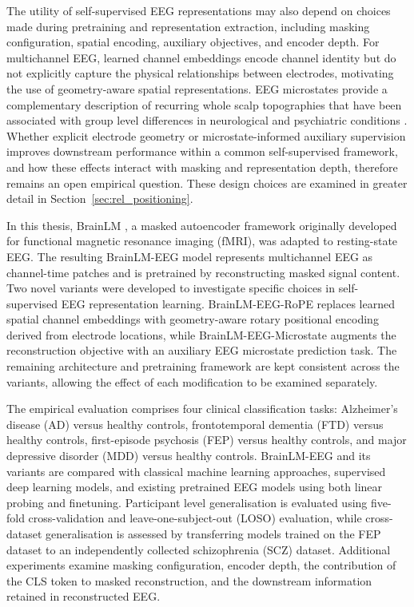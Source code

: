 The utility of self-supervised EEG representations may also depend on choices made during pretraining and representation extraction, including masking configuration, spatial encoding, auxiliary objectives, and encoder depth. For multichannel EEG, learned channel embeddings encode channel identity but do not explicitly capture the physical relationships between electrodes, motivating the use of geometry-aware spatial representations. EEG microstates provide a complementary description of recurring whole scalp topographies that have been associated with group level differences in neurological and psychiatric conditions \parencite{khannaReliabilityRestingStateMicrostate2014a,koenigEEGMetaMicrostates2023}. Whether explicit electrode geometry or microstate-informed auxiliary supervision improves downstream performance within a common self-supervised framework, and how these effects interact with masking and representation depth, therefore remains an open empirical question. These design choices are examined in greater detail in Section~\ref{sec:rel_positioning}.

In this thesis, BrainLM \parencite{caroFOUNDATIONMODELBRAIN2024a}, a masked autoencoder framework originally developed for functional magnetic resonance imaging (fMRI), was adapted to resting-state EEG. The resulting BrainLM-EEG model represents multichannel EEG as channel-time patches and is pretrained by reconstructing masked signal content. Two novel variants were developed to investigate specific choices in self-supervised EEG representation learning. BrainLM-EEG-RoPE replaces learned spatial channel embeddings with geometry-aware rotary positional encoding derived from electrode locations, while BrainLM-EEG-Microstate augments the reconstruction objective with an auxiliary EEG microstate prediction task. The remaining architecture and pretraining framework are kept consistent across the variants, allowing the effect of each modification to be examined separately.

The empirical evaluation comprises four clinical classification tasks: Alzheimer's disease (AD) versus healthy controls, frontotemporal dementia (FTD) versus healthy controls, first-episode psychosis (FEP) versus healthy controls, and major depressive disorder (MDD) versus healthy controls. BrainLM-EEG and its variants are compared with classical machine learning approaches, supervised deep learning models, and existing pretrained EEG models using both linear probing and finetuning. Participant level generalisation is evaluated using five-fold cross-validation and leave-one-subject-out (LOSO) evaluation, while cross-dataset generalisation is assessed by transferring models trained on the FEP dataset to an independently collected schizophrenia (SCZ) dataset. Additional experiments examine masking configuration, encoder depth, the contribution of the CLS token to masked reconstruction, and the downstream information retained in reconstructed EEG.

